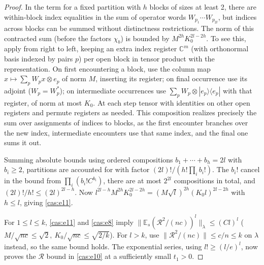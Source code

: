 \begin{proof}
In the term for a fixed partition with \(h\) blocks of sizes at least 2, there are within-block index equalities in the sum of operator words \(W_{p_1}\cdots W_{p_{2l}}\), but indices across blocks can be summed without distinctness restrictions. The norm of this contracted sum (before the factors \(\chi_b\)) is bounded by \(M^{2h}K_0^{2l-2h}\). To see this, apply from right to left, keeping an extra index register \(\mathbb C^m\) (with orthonormal basis indexed by pairs \(p\)) per open block in tensor product with the representation. On first encountering a block, use the column map \(x\mapsto\sum_p W_p x\otimes e_p\) of norm \(M\), inserting its register; on final occurrence use its adjoint (\(W_p=W_p^*\)); on intermediate occurrences use \(\sum_p W_p\otimes |e_p\rangle\langle e_p|\) with that register, of norm at most \(K_0\). At each step tensor with identities on other open registers and permute registers as needed. This composition realizes precisely the sum over assignments of indices to blocks, as the first encounter branches over the new index, intermediate encounters use that same index, and the final one sums it out.

Summing absolute bounds using ordered compositions \(b_1+\cdots+b_h=2l\) with \(b_i\ge2\), partitions are accounted for with factor \((2l)!/(h!\prod_i b_i!)\). The \(b_i!\) cancel in the bound from \(\prod_i(b_i! C^{b_i})\), there are at most \(2^{2l}\) compositions in total, and \((2l)!/h!\le (2l)^{2l-h}\). Now \(l^{2l-h}M^{2h}K_0^{2l-2h}=(M\sqrt l)^{2h}(K_0 l)^{2l-2h}\) with \(h\le l\), giving \eqref{cas:e11}.

For \(1\le l\le k\), \eqref{cas:e11} and \eqref{cas:e8} imply \(\|\mathbb E_s(\mathcal R^2/(nc))^l\|_\lambda\le (C l)^l\) (\(M/\sqrt{nc}\le\sqrt2,\ K_0/\sqrt{nc}\le\sqrt{2/k}\)). For \(l>k\), use \(\|\mathcal R^2/(nc)\|\le c/n\le k\) on \(\lambda\) instead, so the same bound holds. The exponential series, using \(l!\ge(l/e)^l\), now proves the \(\mathcal R\) bound in \eqref{cas:e10} at a sufficiently small \(t_1>0\).


\end{proof}
